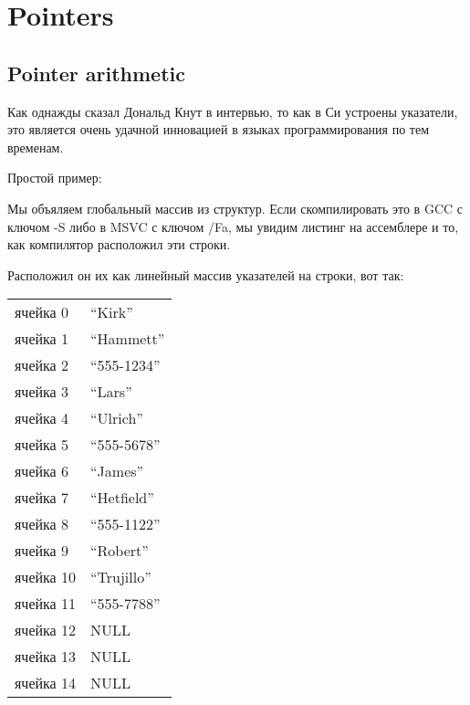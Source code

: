 ﻿\section{Pointers}

\subsection{Pointer arithmetic}

Как однажды сказал Дональд Кнут в интервью\cite{KnuthInterview1993}, то как в Си устроены указатели, это является
очень удачной инновацией в языках программирования по тем временам.

Простой пример:



Мы объяляем глобальный массив из структур. Если скомпилировать это в GCC с ключом -S либо в MSVC с ключом
/Fa, мы увидим листинг на ассемблере и то, как компилятор расположил эти строки. 

Расположил он их как линейный массив указателей на строки, вот так:

\begin{center}
\begin{tabular}{ | l | l | }
\hline
  ячейка 0    & ``Kirk'' \\
  ячейка 1    & ``Hammett'' \\
  ячейка 2    & ``555-1234'' \\
  ячейка 3    & ``Lars'' \\
  ячейка 4    & ``Ulrich'' \\
  ячейка 5    & ``555-5678'' \\
  ячейка 6    & ``James'' \\
  ячейка 7    & ``Hetfield'' \\
  ячейка 8    & ``555-1122'' \\
  ячейка 9    & ``Robert'' \\
  ячейка 10   & ``Trujillo'' \\
  ячейка 11   & ``555-7788'' \\
  ячейка 12   & NULL \\
  ячейка 13   & NULL \\
  ячейка 14   & NULL \\
\hline
\end{tabular}
\end{center}

